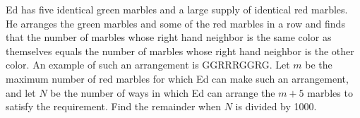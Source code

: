 Ed has five identical green marbles and a large supply of identical red marbles. He arranges the green marbles and some of the red marbles in a row and finds that the number of marbles whose right hand neighbor is the same color as themselves equals the number of marbles whose right hand neighbor is the other color. An example of such an arrangement is GGRRRGGRG. Let $m$ be the maximum number of red marbles for which Ed can make such an arrangement, and let $N$ be the number of ways in which Ed can arrange the $m+5$ marbles to satisfy the requirement. Find the remainder when $N$ is divided by 1000.